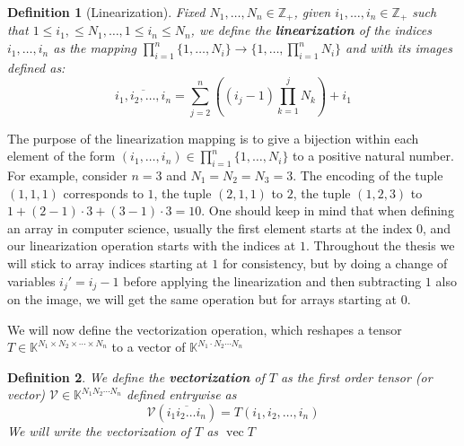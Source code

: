 \documentclass[11pt,a4paper,openright,oneside]{book}
\numberwithin{equation}{section}
\newtheorem{defn0}{Definition}[chapter]
\newenvironment{definition}{ \begin{defn0}}{\end{defn0}}
\DeclareMathOperator{\vectorize}{vec}
\begin{document}
\begin{definition}[Linearization]
    Fixed $N_1, \dots, N_n \in \mathbb{Z}_+$, given $i_1, \dots, i_n \in \mathbb{Z}_+$ such that $1 \leqslant i_1, \leqslant N_1, \dots, 1 \leqslant i_n \leqslant N_n$,
    we define the \textbf{linearization} of the indices $i_1, \dots, i_n$ as the mapping ${\prod_{i=1}^n \{1, \dots, N_i\} \rightarrow \{1, \dots, \prod_{i=1}^n N_i\}}$ and
    with its images defined as:
    $$\overline {i_1, i_2, \dots, i_n} = \sum_{j=2}^{n} \left( (i_j - 1) \prod_{k=1}^j N_k \right) + i_1$$
\end{definition}

The purpose of the linearization mapping is to give a bijection within each element of the form $(i_1, \dots, i_n) \in \prod_{i=1}^n \{1, \dots, N_i\}$
to a positive natural number. For example, consider $n = 3$ and $N_1 = N_2 = N_3 = 3$. The encoding of the tuple $(1, 1, 1)$ corresponds to $1$,
the tuple $(2, 1, 1)$ to $2$, the tuple $(1, 2, 3)$ to $1 + (2 - 1) \cdot 3 + (3 - 1) \cdot 3 = 10$. One should keep in mind
that when defining an array in computer science, usually the first element starts at the index $0$, and our linearization operation starts with
the indices at $1$. Throughout the thesis we will stick to array indices starting at $1$ for consistency, but by doing a change of variables $i_j' = i_j - 1$
before applying the linearization and then subtracting $1$ also on the image, we will get the same operation but for arrays starting at $0$.

We will now define the vectorization operation, which reshapes a tensor $T \in \mathbb{K}^{N_1 \times N_2 \times \cdots \times N_n}$ to a 
vector of $\mathbb{K}^{N_1 \cdot N_2 \cdots N_n}$


\begin{definition}
    We define the \textbf{vectorization} of $T$
    as the first order tensor (or vector) $\mathcal{V} \in \mathbb{K}^{N_1 N_2 \cdots N_n}$ defined entrywise as
    $$\mathcal{V}(\overline{i_1 i_2 \dots i_n}) = T(i_1, i_2, \dots, i_n)$$
    We will write the vectorization of $T$ as $\vectorize{T}$
\end{definition}
\end{document}
